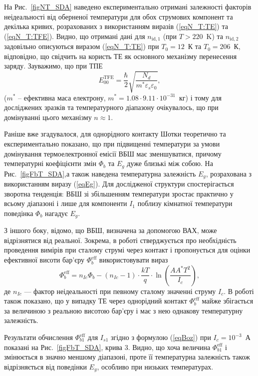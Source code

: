 На Рис.~\ref{figNT_SDA} наведено експериментально отримані залежності факторів неідеальності від оберненої температури
для обох струмових компонент та декілька кривих, розрахованих з використанням виразів (\ref{eqN_T:TE}) та (\ref{eqN_T:TFE}).
Видно, що отримані дані для $n_{\mathrm{id},1}$ (при $T>220$~K) та $n_{\mathrm{id},2}$ задовільно описуються
виразом (\ref{eqN_T:TE}) при $T_0=12$~К та $T_0=206$~К, відповідно,
що свідчить на користь ТЕ як основного механізму перенесення заряду.
Зауважимо, що при ТПЕ
\begin{equation}\label{eqE00:TFE}
E_{00}^\mathrm{TFE}=\frac{\hbar}{2}\sqrt{\frac{N_d}{m^*\varepsilon_s\varepsilon_0}},
\end{equation}
($m^*$ -- ефективна маса електрону, $m^*=1.08\cdot9.11\cdot10^{-31}$~кг)
і тому для досліджених зразків та температурного діапазону очікувалось, що при домінуванні цього механізму $n\approx1$.



Раніше вже згадувалося, для однорідного контакту Шотки теоретично \cite{Rhoderick1988} та експериментально \cite{Aboelfotoh,Zhua} показано,
що при підвищенні температури за умови домінування термоелектронної емісії ВБШ має зменшуватися,
причому температурні коефіцієнти змін $\Phi_b$ та  $E_g$ дуже близькі між собою.
На Рис.~\ref{figFbT_SDA},а також наведена температурна залежність $E_g$, розрахована з використанням
виразу (\ref{eqEg}).
Для дослідженої структури спостерігається зворотна тенденція: ВБШ зі збільшенням температури зростає практично у всьому
діапазоні
і лише для компоненти $I_1$ поблизу кімнатної температури поведінка $\Phi_b$ нагадує $E_g$.

З іншого боку, відомо, що ВБШ, визначена за допомогою ВАХ, може відрізнятися від реальної.
Зокрема, в роботі \cite{Bozhkov} стверджується про необхідність проведення вимірів при сталому струмі через контакт
і пропонується для оцінки ефективної висоти бар'єру $\Phi_{b}^\mathrm{eff}$ використовувати вираз
\begin{equation}\label{eqBoz}
\Phi_{b}^\mathrm{eff}=n_{Ic}\Phi_b-(n_{Ic}-1)\cdot\frac{kT}{q}\cdot\ln\left(\frac{AA^*T^2}{I_c}\right),
\end{equation}
де
$n_{Ic}$ --- фактор неідеальності при певному сталому значенні струму $I_c$.
В роботі \cite{Bozhkov} також показано, що у випадку ТЕ через однорідний контакт $\Phi_{b}^\mathrm{eff}$ майже збігається за величиною
з реальною висотою бар'єру і має з нею однакову температурну залежність.

Результати обчислення $\Phi_{b1}^\mathrm{eff}$ для $I_{s1}$ згідно з формулою (\ref{eqBoz}) при $I_c=10^{-3}$~А показані на Рис.~\ref{figFbT_SDA}, крива 3.
Видно, що хоча величина $\Phi_{b1}^\mathrm{eff}$ і змінюється в значно меншому діапазоні,
проте її температурна залежність також відрізняється від поведінки $E_g$, особливо при низьких температурах.


